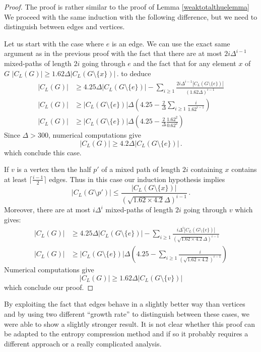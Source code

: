 \documentclass[a4paper,10pt]{article}
\begin{document}
\begin{proof}
The proof is rather similar to the proof of Lemma \ref{weaktotalthuelemma} We proceed with the same induction with the following difference, but we need to distinguish between edges and vertices.

Let us start with the case where $e$ is an edge.
We can use the exact same argument as in the previous proof with the fact that there are at most $2i\Delta^{i-1}$ mixed-paths of length $2i$ going through $e$ and the fact that for any element $x$ of $G$
$|C_L(G)|\ge 1.62\Delta|C_L(G\setminus\{x\})|\,.$ to deduce
\begin{align*}
|C_L(G)|&\ge 4.25\Delta|C_L(G\setminus\{e\})|- \sum_{i\ge1}\frac{2i\Delta^{i-1}|C_L(G\setminus\{e\})|}{(1.62\Delta)^{i-1}}\\
|C_L(G)|&\ge|C_L(G\setminus\{e\})|\Delta \left(4.25- \frac{2}{\Delta}\sum_{i\ge1}\frac{i}{1.62^{i-1}}\right)\\
|C_L(G)|&\ge|C_L(G\setminus\{e\})|\Delta \left(4.25- \frac{2}{\Delta}\frac{1.62^{2}}{0.62^2}\right)
\end{align*}
Since $\Delta>300$, numerical computations give
$$|C_L(G)|\ge 4.2\Delta|C_L(G\setminus\{e\})|\,.$$ which conclude this case.

If $v$ is a vertex then the half $p'$ of a mixed path of length $2i$ containing $x$ contains at least $\lceil \frac{i-1}{2}\rceil$ edges. 
Thus in this case our induction hypothesis implies
$$|C_L(G\setminus p')|\le \frac{|C_L(G\setminus \{x\})|}{(\sqrt{1.62\times4.2}\Delta)^{i-1}}\,.$$
Moreover, there are at most $i\Delta^{i}$ mixed-paths of length $2i$ going through $v$ which gives:
\begin{align*}
|C_L(G)|&\ge 4.25\Delta|C_L(G\setminus\{e\})|- \sum_{i\ge1}\frac{i\Delta^{i}|C_L(G\setminus\{e\})|}{(\sqrt{1.62\times4.2}\Delta)^{i-1}}\\
|C_L(G)|&\ge|C_L(G\setminus\{e\})|\Delta \left(4.25-\sum_{i\ge1}\frac{i}{(\sqrt{1.62\times4.2})^{i-1}}\right)
\end{align*}
Numerical computations give 
 $$|C_L(G)|\ge 1.62\Delta|C_L(G\setminus\{v\})|$$
which conclude our proof.
\end{proof}

By exploiting the fact that edges behave in a slightly better way than vertices and by using two different ``growth rate'' to distinguish between these cases, we were able to show a slightly stronger result. 
It is not clear whether this proof can be adapted to the entropy compression method and if so it probably requires a different approach or a really complicated analysis.
\end{document}
